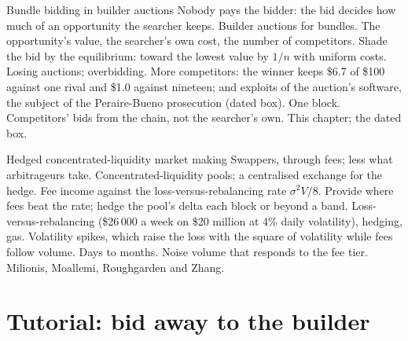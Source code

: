 \begin{strategyfile}{Bundle bidding in builder auctions}\label{strat:hf:on-chain-trading:bidding}
 Nobody pays the bidder: the bid decides how much of an opportunity the searcher keeps.
 Builder auctions for bundles.
 The opportunity's value, the searcher's own cost, the number of competitors.
 Shade the bid by the equilibrium: toward the lowest value by $1/n$ with uniform costs.
 Losing auctions; overbidding.
 More competitors: the winner keeps \$6.7 of \$100 against one rival and \$1.0 against nineteen; and exploits of the auction's
software, the subject of the Peraire-Bueno prosecution (dated box).
 One block.
 Competitors' bids from the chain, not the searcher's own.
 This chapter; the dated box.
\end{strategyfile}

\begin{strategyfile}{Hedged concentrated-liquidity market making}\label{strat:hf:on-chain-trading:hedgedlp}
 Swappers, through fees; less what arbitrageurs take.
 Concentrated-liquidity pools; a centralised exchange for the hedge.
 Fee income against the loss-versus-rebalancing rate $\sigma^2V/8$.
 Provide where fees beat the rate; hedge the pool's delta each block or beyond a band.
 Loss-versus-rebalancing (\$26\,000 a week on \$20 million at 4\% daily volatility), hedging, gas.
 Volatility spikes, which raise the loss with the square of volatility while fees follow volume.
 Days to months.
 Noise volume that responds to the fee tier.
 Milionis, Moallemi, Roughgarden and Zhang.
\end{strategyfile}

\section{Tutorial: bid away to the builder}\label{tut:hf:on-chain-trading:tut}

